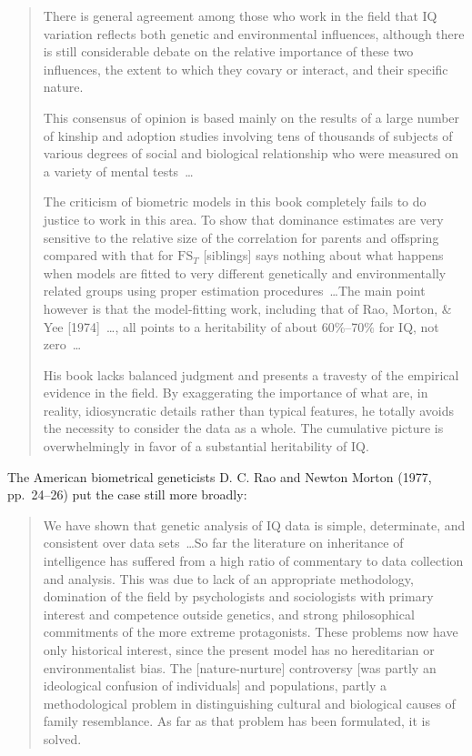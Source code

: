 ﻿\documentclass[12pt]{article}
\begin{document}
\begin{quote}
There is general agreement among those who work in the field that IQ variation reflects both genetic and environmental influences, although there is still considerable debate on the relative importance of these two influences, the extent to which they covary or interact, and their specific nature.

This consensus of opinion is based mainly on the results of a large number of kinship and adoption studies involving tens of thousands of subjects of various degrees of social and biological relationship who were measured on a variety of mental tests~\ldots

The criticism of biometric models in this book completely fails to do justice to work in this area. To show that dominance estimates are very sensitive to the relative size of the correlation for parents and offspring compared with that for $\mathrm{FS}_T$ [siblings] says nothing about what happens when models are fitted to very different genetically and environmentally related groups using proper estimation procedures~\ldots The main point however is that the model-fitting work, including that of Rao, Morton, \& Yee [1974]~\ldots, all points to a heritability of about 60\%--70\% for IQ, not zero~\ldots

His book lacks balanced judgment and presents a travesty of the empirical evidence in the field. By exaggerating the importance of what are, in reality, idiosyncratic details rather than typical features, he totally avoids the necessity to consider the data as a whole. The cumulative picture is overwhelmingly in favor of a substantial heritability of IQ.
\end{quote}

The American biometrical geneticists D. C. Rao and Newton Morton (1977, pp.\ 24--26) put the case still more broadly:

\begin{quote}
We have shown that genetic analysis of IQ data is simple, determinate, and consistent over data sets~\ldots So far the literature on inheritance of intelligence has suffered from a high ratio of commentary to data collection and analysis. This was due to lack of an appropriate methodology, domination of the field by psychologists and sociologists with primary interest and competence outside genetics, and strong philosophical commitments of the more extreme protagonists. These problems now have only historical interest, since the present model has no hereditarian or environmentalist bias. The [nature-nurture] controversy [was partly an ideological confusion of individuals] and populations, partly a methodological problem in distinguishing cultural and biological causes of family resemblance. As far as that problem has been formulated, it is solved.
\end{quote}
\end{document}
